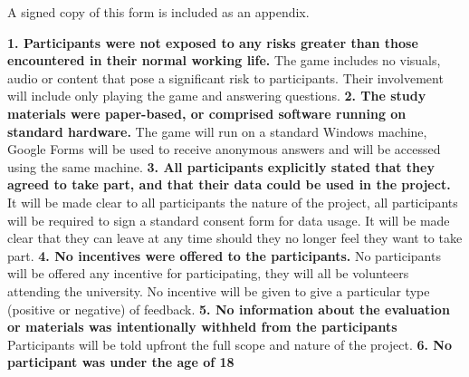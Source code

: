 \documentclass{report}
\begin{document}
A signed copy of this form is included as an appendix.
\begin{raggedright}
\newline
\newline
\textbf{1. Participants were not exposed to any risks greater than those
encountered in their normal working life.}
\newline
\newline
The game includes no visuals, audio or content that pose a significant risk to participants. Their involvement will include only playing the game and answering questions.
\newline
\newline
\textbf{2. The study materials were paper-based, or comprised software
running on standard hardware.}
\newline
\newline
The game will run on a standard Windows machine, Google Forms will be used to receive anonymous answers and will be accessed using the same machine.
\newline
\newline
\textbf{3. All participants explicitly stated that they agreed to take part,
and that their data could be used in the project.}
\newline
\newline
It will be made clear to all participants the nature of the project, all participants will be required to sign a standard consent form for data usage. It will be made clear that they can leave at any time should they no longer feel they want to take part.
\newline
\newline
\textbf{4. No incentives were offered to the participants.}
\newline
\newline
No participants will be offered any incentive for participating, they will all be volunteers attending the university. No incentive will be given to give a particular type (positive or negative) of feedback.
\newline
\newline
\textbf{5. No information about the evaluation or materials was intentionally withheld
from the participants}
\newline
\newline
Participants will be told upfront the full scope and nature of the project.
\newline
\newline
\textbf{6. No participant was under the age of 18}

\end{raggedright}
\end{document}

